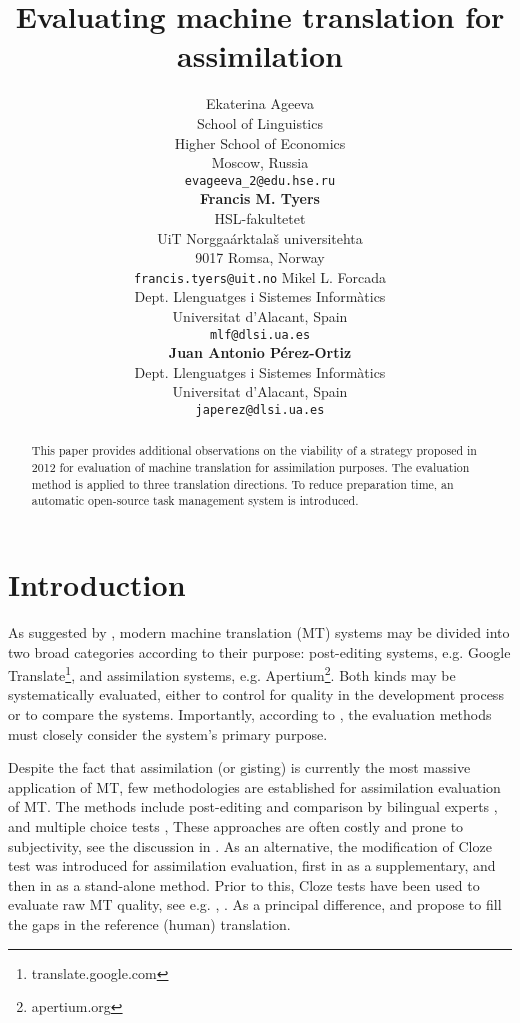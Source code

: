 \documentclass[11pt]{article}
\title{Evaluating machine translation for assimilation}
\author{Ekaterina Ageeva\\
  School of Linguistics\\
  Higher School of Economics\\
  Moscow, Russia\\
  {\tt evageeva\_2@edu.hse.ru}\\[2ex]
  \textbf{Francis M. Tyers}\\
  HSL-fakultetet\\ 
  UiT Norgga\'{a}rktala\v{s} universitehta \\
  9017 Romsa, Norway \\
  {\tt francis.tyers@uit.no}
  \And
  Mikel L. Forcada\\
  Dept. Llenguatges i Sistemes Inform\`{a}tics\\
  Universitat d'Alacant, Spain \\
  {\tt mlf@dlsi.ua.es}  \\[2ex]
  \textbf{Juan Antonio P\'{e}rez-Ortiz} \\
  Dept. Llenguatges i Sistemes Inform\`{a}tics\\
  Universitat d'Alacant, Spain \\
  {\tt japerez@dlsi.ua.es}
}
\date{}
\newcommand{\comment}[1]{\marginpar{\scriptsize\sf \textcolor{blue}{#1}}}
\begin{document}
\maketitle
\begin{abstract}
This paper provides additional observations on the viability of a strategy proposed in 2012 for evaluation of machine translation for assimilation purposes. The evaluation method is applied to three translation directions. To reduce preparation time, an automatic open-source task management system is introduced.
\end{abstract}

\section{Introduction}

As suggested by \citet{church93}, modern machine translation (MT) systems may
be divided into two broad categories according to their purpose: post-editing systems, e.g.
Google Translate\footnote{translate.google.com}, and assimilation systems, e.g. Apertium\footnote{apertium.org}. Both kinds may be systematically evaluated, either to control for quality in the development process or to compare the systems. Importantly, according to \citet{church93}, the evaluation methods must closely consider the system's primary purpose.
\comment{FMT: Apertium can also be used for postedition, e.g. spanish-catalan, and some Google translate directions aren't suitable for that. Perhaps reword or remove this}

\comment{EA: I'd like a citation for the ``most massive application'', could you suggest something?}
Despite the fact that assimilation (or gisting) is currently the most massive application of MT, few methodologies are established for assimilation evaluation of MT. The methods include post-editing and comparison by bilingual experts \citep{ginesti09}, and multiple choice tests \citep{jones07}, \citep{trosterud12} These approaches are often costly and prone to subjectivity, see the discussion in \citep{oregan13}. As an alternative, the modification of Cloze test was introduced for assimilation evaluation, first in \citep{trosterud12} as a supplementary, and then in \citep{oregan13} as a stand-alone method. Prior to this, Cloze tests have been used to evaluate raw MT quality, see e.g. \citep{vanslype79}, \citep{somers00}. As a principal difference, \citet{trosterud12} and \citet{oregan13} propose to fill the gaps in the reference (human) translation.
\end{document}
